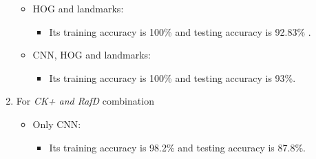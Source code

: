 \begin{enumerate}
\begin{itemize}
    \item HOG and landmarks: 
        \begin{itemize}
            \item Its training accuracy is 100\% and testing accuracy is 92.83\% .
        \end{itemize}
    \item CNN, HOG and landmarks: 
        \begin{itemize}
            \item Its training accuracy is 100\% and testing accuracy is 93\%.
        \end{itemize}
\end{itemize}
\item For \textit{CK+ and RafD} combination \newline
\begin{itemize}
    \item Only CNN: 
        \begin{itemize}
            \item Its training accuracy is 98.2\% and testing accuracy is 87.8\%.
        \end{itemize}

	\begin{comment}
    \item Only HOG: 
        \begin{itemize}
            \item It takes X time in training and X time in testing.
            \item The model size was X.
            \item Its training accuracy is X and testing accuracy is X.
        \end{itemize}
    \item Only landmarks: 
        \begin{itemize}
            \item It takes X time in training and X time in testing.
            \item The model size was X.
            \item Its training accuracy is X and testing accuracy is X.
        \end{itemize}
	\end{comment}


\end{itemize}
\end{enumerate}
